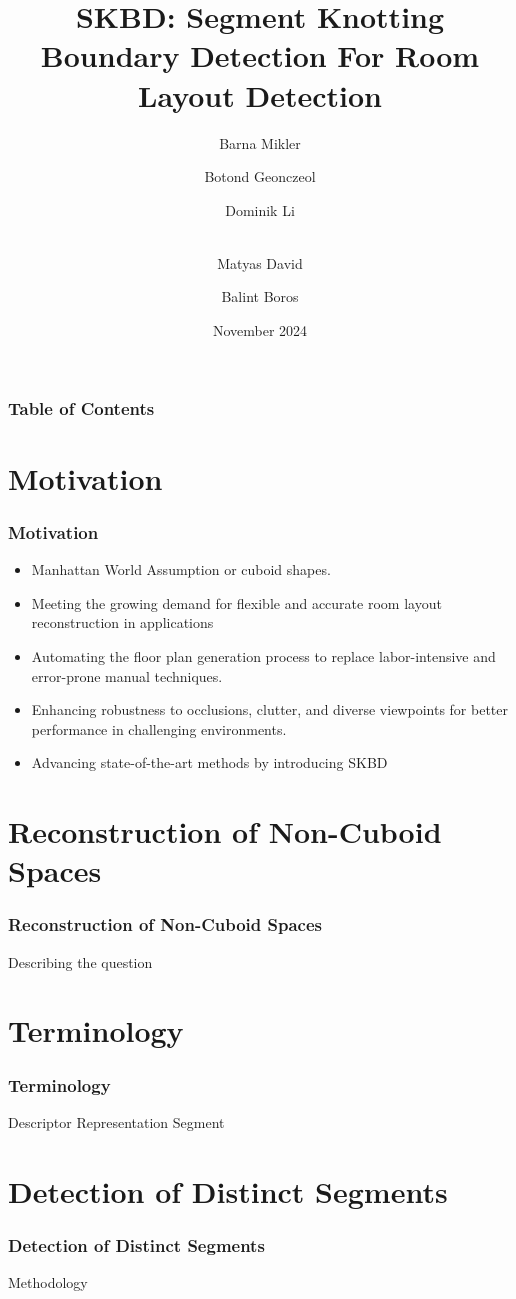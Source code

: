 \documentclass{beamer}
\title[SKBD] {SKBD: Segment Knotting Boundary Detection For Room Layout Detection}
\author[Pictures]
{Barna Mikler \and Botond Geonczeol \and Dominik Li \and \\ Matyas David \and Balint Boros}
\institute[ELTE]{Eötvös Loránd University \\ Faculty of Informatics}
\date[2024] {November 2024}
\begin{document}
\frame{\titlepage}

\begin{frame}
\frametitle{Table of Contents}
\tableofcontents
\end{frame}  

\section{Motivation}
\begin{frame}
\frametitle{Motivation}
\begin{itemize}
    \item Manhattan World Assumption or cuboid shapes.
    \item Meeting the growing demand for flexible and accurate room layout reconstruction in applications
    \item Automating the floor plan generation process to replace labor-intensive and error-prone manual techniques.
    \item Enhancing robustness to occlusions, clutter, and diverse viewpoints for better performance in challenging environments.
    \item Advancing state-of-the-art methods by introducing SKBD
\end{itemize}

\end{frame}

\section{Reconstruction of Non-Cuboid Spaces}
\begin{frame}
\frametitle{Reconstruction of Non-Cuboid Spaces}
Describing the question
\end{frame}

\section{Terminology}
\begin{frame}
\frametitle{Terminology}
Descriptor
Representation
Segment

\end{frame}

\section{Detection of Distinct Segments}
\begin{frame}
\frametitle{Detection of Distinct Segments}
Methodology
\end{frame}
\end{document}
